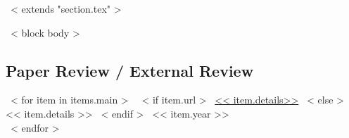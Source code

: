 ~< extends "section.tex" >~

~< block body >~
\subsection{Paper Review / External Review}
  ~< for item in items.main >~
    ~< if item.url >~
      \href{<< item.url >>}{<< item.details>>}
    ~< else >~
      << item.details >>
    ~< endif >~
    \hfill << item.year >> \\
~< endfor >~
\vspace{-3mm}

